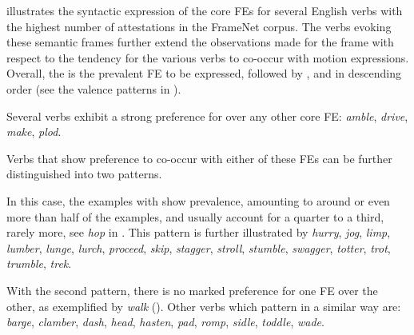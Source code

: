 \documentclass[output=paper,colorlinks,citecolor=brown]{langscibook}
\begin{document}

 illustrates the syntactic expression of the core FEs for several English verbs with the highest number of attestations in the FrameNet corpus. The verbs evoking these semantic frames further extend the observations made for the  frame with respect to the tendency for the various verbs to co-occur with motion expressions. Overall, the  is the prevalent FE to be expressed, followed by ,  and  in descending order (see the valence patterns in ).

\begin{description}[font=\normalfont]
\item[\fename{Path}:] Several verbs exhibit a strong preference for  over any other core FE: \textit{amble}, \textit{drive}, \textit{make}, \textit{plod}.
\item[\fename{Path or Goal}:] Verbs that show preference to co-occur with either of these FEs can be further distinguished into two patterns.

\item[The first one is \fename{Path} > \fename{Goal}:] In this case, the examples with  show prevalence, amounting to around or even more than half of the examples, and  usually account for a quarter to a third, rarely more, see \textit{hop} in . This pattern is further illustrated by \textit{hurry}, \textit{jog}, \textit{limp}, \textit{lumber}, \textit{lunge}, \textit{lurch}, \textit{proceed}, \textit{skip}, \textit{stagger}, \textit{stroll}, \textit{stumble}, \textit{swagger}, \textit{totter}, \textit{trot}, \textit{trumble}, \textit{trek}.

\item[\fename{Path} = \fename{Goal}:] With the second pattern, there is no marked preference for one FE over the other, as exemplified by \textit{walk} (). Other verbs which pattern in a similar way are: \textit{barge}, %
\textit{clamber}, \textit{dash}, \textit{head}, \textit{hasten}, \textit{pad}, \textit{romp}, \textit{sidle}, \textit{toddle}, \textit{wade}.
       

\end{description}
\end{document}
